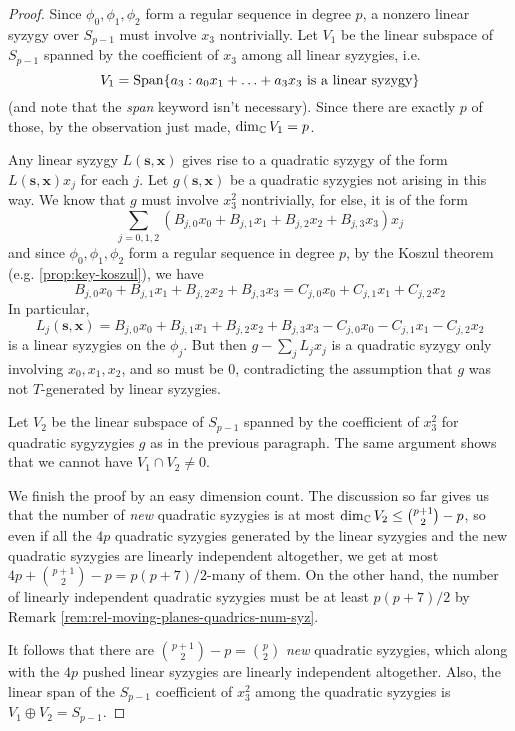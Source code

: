 \documentclass[fleqn,reqno]{amsart}
\numberwithin{first}{chapter}
\numberwithin{section}{chapter}
\numberwithin{equation}{first}
\begin{document}
\begin{proof}
	Since $\phi_0,\phi_1,\phi_2$ form a regular sequence in degree $p$,
	a nonzero linear syzygy over $S_{p-1}$ must involve $x_3$ nontrivially.
	Let $V_1$ be the linear subspace of $S_{p-1}$ spanned by the
	coefficient of $x_3$ among all linear syzygies, i.e.
	\[
		V_1=\operatorname{Span}\{a_3:a_0x_1+\ldots+a_3x_3 \text{ is a linear syzygy}\}
	\]
	(and note that the {\em span} keyword isn't necessary).
	Since there are exactly $p$ of those, by the observation just made, $\dim_{\mathbb{C}} V_1=p$.
	
	Any linear syzygy $L(\mathbf s, \mathbf x)$ gives rise to a quadratic syzygy of the form
	$L(\mathbf s, \mathbf x)x_j$ for each $j$.
	Let $g(\mathbf s,\mathbf x)$ be a quadratic syzygies not arising in this way.
	We know that $g$ must involve $x_3^2$ nontrivially,
	for else, it is of the form
	\[
		\sum_{j=0,1,2} (B_{j,0}x_0+B_{j,1}x_1+B_{j,2}x_2+B_{j,3}x_3) x_j
	\]
	and since $\phi_0,\phi_1,\phi_2$ form a regular sequence in degree $p$,
	by the Koszul theorem (e.g. \ref{prop:key-koszul}),
	we have
	\[
		B_{j,0}x_0+B_{j,1}x_1+B_{j,2}x_2+B_{j,3}x_3=C_{j,0}x_0+C_{j,1}x_1+C_{j,2}x_2
	\]
	In particular,
	\[
		L_j(\mathbf s,\mathbf x)=B_{j,0}x_0+B_{j,1}x_1+B_{j,2}x_2+B_{j,3}x_3-C_{j,0}x_0-C_{j,1}x_1-C_{j,2}x_2
	\]
	is a linear syzygies on the $\phi_j$.
	But then $g-\sum_j L_jx_j$ is a quadratic syzygy only involving $x_0,x_1,x_2$,
	and so must be $0$, contradicting the assumption that $g$ was not $T$-generated by linear syzygies.
	
	Let $V_2$ be the linear subspace of $S_{p-1}$ spanned by the coefficient of $x_3^2$ for quadratic
	sygyzygies $g$ as in the previous paragraph. The same argument shows that we cannot have $V_1\cap V_2\neq0$.
	
	We finish the proof by an easy dimension count.
	The discussion so far gives us that the number of {\em new} quadratic syzygies is at most
	$\dim_{\mathbb{C}} V_2\leq\binom{p+1}{2}-p$,
	so even if all the $4p$ quadratic syzygies generated by the linear syzygies
	and the new quadratic syzygies are linearly independent altogether,
	we get at most $4p+\binom{p+1}{2}-p=p(p+7)/2$-many of them.
	On the other hand,
	the number of linearly independent quadratic syzygies must be at least $p(p+7)/2$
	by Remark \ref{rem:rel-moving-planes-quadrics-num-syz}.
	
	It follows that there are $\binom{p+1}{2}-p=\binom{p}{2}$ {\em new} quadratic syzygies,
	which along with the $4p$ pushed linear syzygies are linearly independent altogether.
	Also, the linear span of the $S_{p-1}$ coefficient of $x_3^2$ among the quadratic syzygies
	is $V_1\oplus V_2=S_{p-1}$.
\end{proof}
\end{document}
